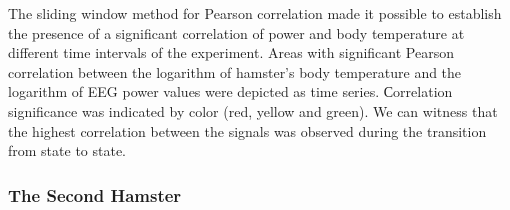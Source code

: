 \documentclass[14pt,a4paper]{scrartcl}
\begin{document}
The sliding window method for Pearson correlation made it possible to establish the presence of a significant correlation of power and body temperature at different time intervals of the experiment. Areas with significant Pearson correlation between the logarithm of hamster's body temperature and the logarithm of EEG power values were depicted as time series. Сorrelation significance was indicated by color (red, yellow and green). We can witness that the highest correlation between the signals was observed during the transition from state to state. 

\subsubsection{The Second Hamster}
\label{sec:Results:The Hamster Experiment:The Second Hamster} 
\end{document}
